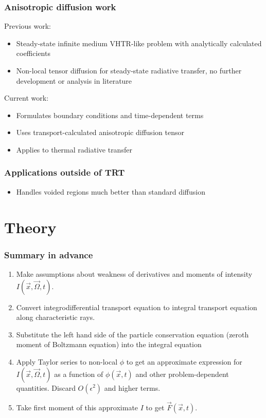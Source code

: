 \documentclass{beamer}
\begin{document}
\begin{frame}
  \frametitle{Anisotropic diffusion work}
  Previous work:
  \begin{itemize}
    \item Steady-state infinite medium VHTR-like problem with analytically
      calculated coefficients \cite{Lar2009c}
    \item Non-local tensor diffusion \cite{Mor2007} for steady-state
      radiative transfer, no further development or analysis in literature
  \end{itemize}
  Current work:
  \begin{itemize}
    \item Formulates boundary conditions and time-dependent terms
    \item Uses transport-calculated anisotropic diffusion tensor
    \item Applies to thermal radiative transfer
  \end{itemize}
\end{frame}

\begin{frame}
  \frametitle{Applications outside of TRT}
  \begin{itemize}
    \item Handles voided regions much better than standard diffusion
  \end{itemize}
\end{frame}
\section{Theory}
\begin{frame}
  \frametitle{Summary in advance}
  \begin{enumerate}
    \item Make assumptions about weakness of derivatives and moments of
      intensity $I(\vec{x}, \vec{\Omega}, t)$.
    \item Convert integrodifferential transport equation to integral transport
      equation along characteristic rays.
    \item Substitute the left hand side of the particle conservation equation
      (zeroth moment of Boltzmann equation) into the integral equation
    \item Apply Taylor series to non-local $\phi$ to get an approximate
      expression for $I(\vec{x}, \vec{\Omega}, t)$ as a function of
      $\phi(\vec{x}, t)$ and other problem-dependent quantities.
      Discard $O(\epsilon^2)$ and higher terms.
    \item Take first moment of this approximate $I$ to get
      $\vec{F}(\vec{x}, t)$.
  \end{enumerate}
\end{frame}
\end{document}
